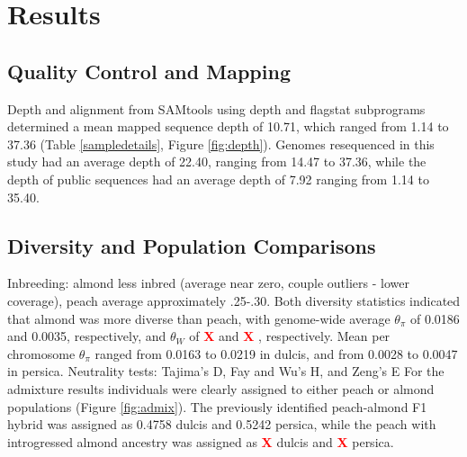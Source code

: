 \documentclass[12pt]{article}
\newcommand{\X}{\textcolor{red}{\bf X }}
\begin{document}
%
%
\section*{Results}
\subsection*{Quality Control and Mapping}

Depth and alignment from SAMtools using depth and flagstat subprograms \citep{li2009sequence} determined a mean mapped sequence depth of 10.71, which ranged from 1.14 to 37.36 (Table \ref{sampledetails}, Figure \ref{fig:depth}). 
%
Genomes resequenced in this study had an average depth of 22.40, ranging from 14.47 to 37.36, while the depth of public sequences had an average depth of 7.92 ranging from 1.14 to 35.40.
%
%
\subsection*{Diversity and Population Comparisons}

Inbreeding: almond less inbred (average near zero, couple outliers - lower coverage), peach average approximately .25-.30.
%
Both diversity statistics indicated that almond was more diverse than peach, with genome-wide average $\theta_{\pi}$ of 0.0186 and 0.0035, respectively, and $\theta_{W}$ of \X and \X, respectively.
%
Mean per chromosome $\theta_{\pi}$ ranged from 0.0163 to 0.0219 in dulcis, and from 0.0028 to 0.0047 in persica.
%
Neutrality tests: Tajima's D, Fay and Wu's H, and Zeng's E
%
For the admixture results individuals were clearly assigned to either peach or almond populations (Figure \ref{fig:admix}). 
%
The previously identified peach-almond F1 hybrid was assigned as 0.4758 dulcis and 0.5242 persica, while the peach with introgressed almond ancestry was assigned as \X dulcis and \X persica.
%
\end{document}
